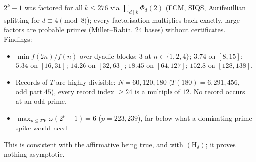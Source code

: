 \documentclass[11pt]{article}
\theoremstyle{remark}
\begin{document}
$2^k-1$ was factored for all $k\le276$ via $\prod_{d\mid k}\Phi_d(2)$ (ECM, SIQS, Aurifeuillian
splitting for $d\equiv4\pmod8$); every factorisation multiplies back exactly, large factors are
probable primes (Miller--Rabin, 24 bases) without certificates. Findings:
\begin{itemize}
\item $\min f(2n)/f(n)$ over dyadic blocks: $3$ at $n\in\{1,2,4\}$; $3.74$ on $[8,15]$; $5.34$ on
  $[16,31]$; $14.26$ on $[32,63]$; $18.45$ on $[64,127]$; $152.8$ on $[128,138]$.
\item Records of $T$ are highly divisible: $N=60,120,180$ ($T(180)=6{,}291{,}456$, odd part $45$),
  every record index $\ge24$ is a multiple of $12$. No record occurs at an odd prime.
\item $\max_{p\le276}\omega(2^p-1)=6$ ($p=223,239$), far below what a dominating prime spike would
  need.
\end{itemize}
This is consistent with the affirmative being true, and with $(\mathrm H_\delta)$; it proves nothing
asymptotic.
\end{document}
